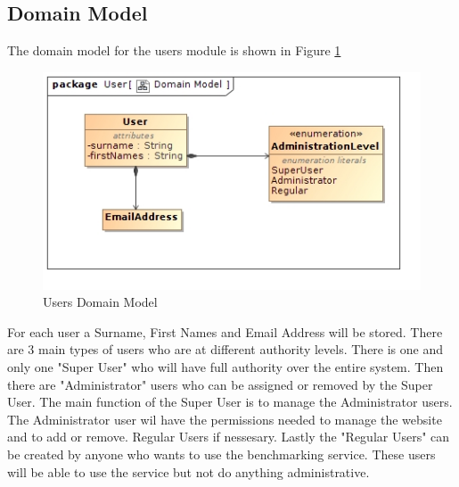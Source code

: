 \subsection{Domain Model}
The domain model for the users module is shown in Figure \ref{Users Domain Model}
\begin{figure}[H]
  \begin{center}
  \includegraphics[scale=1.0]{../Diagrams and Charts/Users/Domain Model.jpg}  
  \caption{Users Domain Model}
  \end{center}
  \label{Users Domain Model}
\end{figure}
For each user a Surname, First Names and Email Address will be stored.
There are 3 main types of users who
are at different authority levels. There is one and only one "Super User" who
will have full authority over the entire system. Then there are "Administrator"
users who can be assigned or removed by the Super User. The main function of
the Super User is to manage the Administrator users. The Administrator user
wil have the permissions needed to manage the website and to add or remove.
Regular Users if nessesary. Lastly the "Regular Users"
can be created by anyone who wants to use the benchmarking service. These users
will be able to use the service but not do anything administrative.
